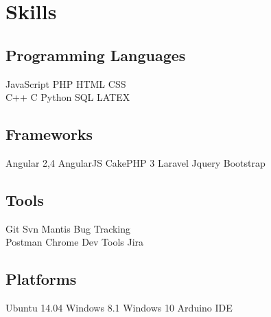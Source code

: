 \documentclass[]{deedy-resume-openfont}
\begin{document}
%
%



%
%

\begin{minipage}[t]{0.33\textwidth} 


\section{Skills}
\subsection{Programming Languages}

JavaScript \textbullet{}   PHP \textbullet{} HTML \textbullet{} CSS \\
C++ \textbullet{} C \textbullet{} Python \textbullet{} SQL \textbullet{} LATEX 
\sectionsep

\subsection{Frameworks}
Angular 2,4  \textbullet{}AngularJS \textbullet{} CakePHP 3 \newline \textbullet{} Laravel \textbullet{} Jquery \textbullet{} Bootstrap 
\sectionsep

\subsection{Tools}
Git \textbullet{} Svn \textbullet{} Mantis Bug Tracking \\ \textbullet{} Postman  \textbullet{} Chrome Dev Tools \textbullet{} Jira 
\sectionsep

\subsection{Platforms}
Ubuntu 14.04 \textbullet{} Windows 8.1 \newline \textbullet{} Windows 10 \textbullet{} Arduino IDE


\end{minipage}
\end{document}

